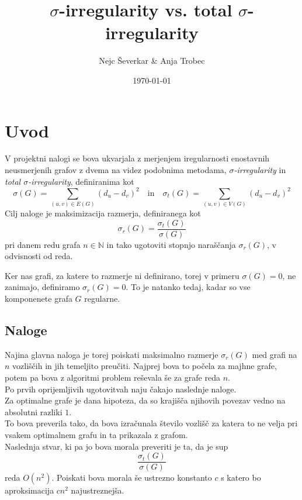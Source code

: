 \documentclass[ letterpaper, titlepage, fleqn]{article}
\begin{document}
\title{$\sigma$-irregularity vs. total $\sigma$-irregularity}
\author{Nejc Ševerkar \& Anja Trobec}
\date{\today}
\maketitle
\pagebreak

\thispagestyle{empty}
\tableofcontents
\pagebreak

\section{Uvod}
V projektni nalogi se bova ukvarjala z merjenjem iregularnosti enostavnih neusmerjenih grafov z
dvema na videz podobnima metodama, {\em $\sigma$-irregularity} in {\em total $\sigma$-irregularity},
definiranima kot 
$$
\sigma(G) = \sum_{(u, v) \in E(G)}(d_u - d_v)^2 
\quad \text{in} \quad
\sigma_t(G) = \sum_{(u, v) \in V(G)}(d_u - d_v)^2
$$
Cilj naloge je maksimizacija razmerja, definiranega kot 
$$\sigma_r(G) = \frac{\sigma_t(G)}{\sigma(G)}$$
pri danem redu grafa $n \in \mathbb{N}$ in tako ugotoviti 
stopnjo naraščanja $\sigma_r(G)$, v odvisnosti od reda.

Ker nas grafi, za katere to razmerje ni definirano,
torej v primeru $\sigma(G) = 0$, ne zanimajo, definiramo $\sigma_r(G) = 0$.
To je natanko tedaj, kadar so vse komponenete grafa $G$ regularne.

\subsection{Naloge}

Najina glavna naloga je torej poiskati maksimalno razmerje $\sigma_r(G)$ med grafi na $n$
vozliščih in jih temeljito preučiti. Najprej bova to počela za majhne grafe, potem pa bova 
z algoritmi problem reševala še za grafe reda $n$. \\

Po prvih oprijemljivih ugotovitvah naju čakajo naslednje naloge. \\

Za optimalne grafe je dana hipoteza, da so krajišča njihovih povezav vedno na absolutni razliki $1$. \\
To bova preverila tako, da bova izračunala število vozlišč za katera
to ne velja pri vsakem optimalnem grafu in ta prikazala z grafom. \\

Naslednja stvar, ki pa jo bova morala preveriti je ta, da je sup$$\frac{\sigma_t(G)}{\sigma(G)}$$ 
reda $O(n^2)$. 
Poiskati bova morala še ustrezno konstanto $c$ s katero bo aproksimacija $cn^2$ najustreznejša.
\end{document}
